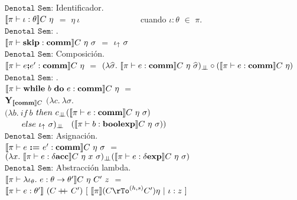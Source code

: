 \noindent
$\texttt{Denotal Sem:}$ Identificador.\\

$\semBrcks{ \pi \vdash \iota : \theta }C \ \eta$ $=$ $\eta \ \iota$
\ \ \ \ \ \ \ \ \ \ \ \ \ \ cuando $\iota:\theta$ $\in$ $\pi$.\\

\noindent
$\texttt{Denotal Sem:}$ \cskip.\\

$\semBrcks{ \pi \vdash \cskip : \commt }C \ \eta \ \sigma$ $=$ $\iota_{\uparrow} \ \sigma$\\

\noindent
$\texttt{Denotal Sem:}$ Composici\'on.\\

$\llbracket  \pi \vdash e \textbf{;} e' : \textbf{comm}  \rrbracket C \ \eta$ 
$=$ 
$(\lambda \widehat{\sigma} . \ \llbracket \pi \vdash e : \textbf{comm} \rrbracket C \ \eta \ \widehat{\sigma})_{\bot \!\!\! \bot}
\circ
(\llbracket  \pi \vdash e : \textbf{comm} \rrbracket C \ \eta)$\\

\noindent
$\texttt{Denotal Sem:}$ \cwhile.\\

$\llbracket  \pi \vdash \textbf{while} \ b \ \textbf{do} \ e : \textbf{comm}  \rrbracket C \ \eta$ 
$=$ \\
\indent \indent \indent
$\textbf{Y}_{\llbracket \textbf{comm} \rrbracket C}$ $(\lambda c . \ \lambda \sigma . \ $\\
\indent \indent \indent \indent \indent \indent
$(\lambda b . \ if \ b $ $then \ c_{\bot \!\!\! \bot} (\llbracket \pi \vdash e : \textbf{comm} \rrbracket C \ \eta \ \sigma)$\\
 \indent \indent  \indent \indent \indent \indent \indent \indent \ \ \ \
$else \ \iota_{\uparrow} \ \sigma)_{\bot \!\!\! \bot}$ \
$(\llbracket  \pi \vdash b : \textbf{boolexp} \rrbracket C \ \eta \ \sigma))$\\

\noindent
$\texttt{Denotal Sem:}$ Asignaci\'on.\\

$\llbracket  \pi \vdash e \ \textbf{:=} \ e' : \textbf{comm}  \rrbracket C \ \eta \ \sigma$ 
$=$ \\
\indent \indent \indent \indent \indent 
$(\lambda x . \ \llbracket \pi \vdash e : \delta \textbf{acc} \rrbracket C \ \eta \ x \ \sigma)_{\bot \!\!\! \bot}
(\llbracket  \pi \vdash e : \delta \textbf{exp}  \rrbracket C \ \eta \ \sigma)$\\

\noindent
$\texttt{Denotal Sem:}$ Abstracci\'on lambda.\\

$\llbracket  \pi \vdash \lambda \iota_{\theta} . \ e : \theta \rightarrow \theta'  \rrbracket C \ \eta \ C' \ z$ 
$=$ \\
\indent \indent \indent \indent \indent 
$\semBrcks{ \pi \vdash e : \theta' } \ (C \concat C') \
[ \ \semBrcks{\pi}(C \rTo^{(h,s)} C')\eta \ | \ \iota:z \ ]$\\
